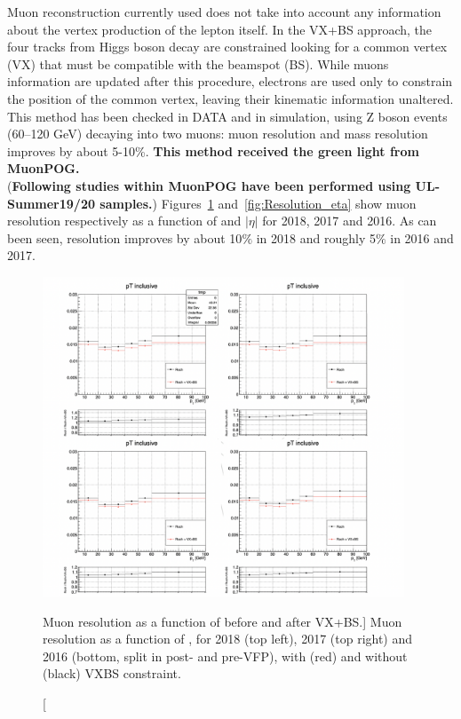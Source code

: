 Muon reconstruction currently used does not take into account any information about the 
vertex production of the lepton itself. %
In the VX+BS approach, the four tracks from Higgs boson decay are constrained looking for a common 
vertex (VX) that must be compatible with the beamspot (BS). 
While muons information are updated after this procedure,
electrons are used only to constrain the position of the common vertex, 
leaving their kinematic information unaltered. \\
This method has been checked in DATA and in simulation, using Z boson events (60--120 GeV)
decaying into two muons: muon \pT resolution and mass resolution improves by about 5-10\%. 
\textbf{This method received the green light from MuonPOG.}\\
(\textbf{Following studies within MuonPOG have been performed using UL-Summer19/20 samples.})
Figures~\ref{fig:Resolution_pT} and~\ref{fig:Resolution_eta} show muon resolution respectively 
as a function of \pT and $|\eta|$ for 2018, 2017 and 2016.
As can been seen, resolution improves by about 10$\%$ in 2018 and roughly 5$\%$ in 2016 and 2017.
\begin{figure}[!htbp]
\begin{center}
	\includegraphics[width=0.96\textwidth]{figures/higgsmassmeas/vxbs/vxbs_muon_pTresol_vs_pT.png}
    \caption
    [Muon \pT resolution as a function of \pT before and after VX+BS.]
    {Muon \pT resolution as a function of \pT, for 2018 (top left), 2017 (top right) 
and 2016 (bottom, split in post- and pre-VFP), with (red) and without (black) VXBS constraint.} %
\label{fig:Resolution_pT}
\end{center}
\end{figure}
